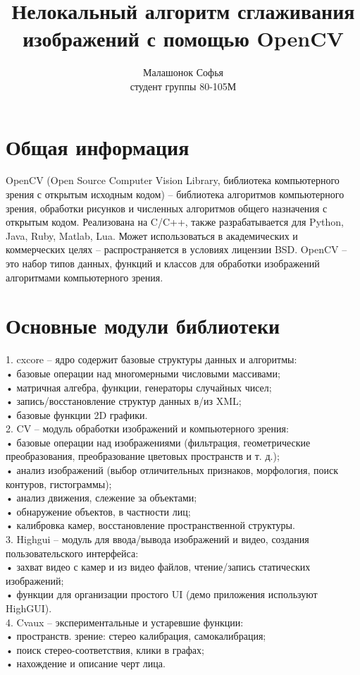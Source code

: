 \documentclass[a4paper,12pt]{article}
\author{Малашонок Софья \\студент группы 80-105М}
\title{Нелокальный алгоритм сглаживания изображений с помощью OpenCV}
\begin{document}
\maketitle
\section{Общая информация}
OpenCV (Open Source Computer Vision Library, библиотека компьютерного зрения с открытым исходным кодом) – библиотека алгоритмов компьютерного зрения, обработки рисунков и численных алгоритмов общего назначения с открытым кодом. Реализована на C/C++, также разрабатывается для Python, Java, Ruby, Matlab, Lua. Может  использоваться в академических и коммерческих целях – распространяется в условиях лицензии BSD. OpenCV – это набор типов данных, функций и классов для обработки изображений алгоритмами компьютерного зрения.
\section{Основные модули библиотеки}
1.	cxcore – ядро содержит базовые структуры данных и алгоритмы:
\\•	базовые операции над многомерными числовыми массивами;
\\•	матричная алгебра, функции, генераторы случайных чисел;
\\•	запись/восстановление структур данных в/из XML;
\\•	базовые функции 2D графики.
\\2.	CV – модуль обработки изображений и компьютерного зрения:
\\•	базовые операции над изображениями (фильтрация, геометрические преобразования, преобразование цветовых пространств и т. д.);
\\•	анализ изображений (выбор отличительных признаков, морфология, поиск контуров, гистограммы);
\\•	анализ движения, слежение за объектами;
\\•	обнаружение объектов, в частности лиц;
\\•	калибровка камер, восстановление пространственной структуры.
\\3.	Highgui – модуль для ввода/вывода изображений и видео, создания пользовательского интерфейса:
\\•	захват видео с камер и из видео файлов, чтение/запись статических изображений;
\\•	функции для организации простого UI (демо приложения используют HighGUI).
\\4.	Cvaux – экспериментальные и устаревшие функции:
\\•	пространств. зрение: стерео калибрация, самокалибрация;
\\•	поиск стерео-соответствия, клики в графах;
\\•	нахождение и описание черт лица.
\end{document}

